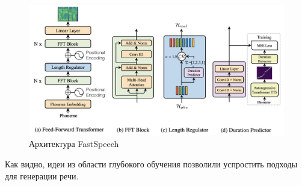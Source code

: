 \begin{figure}[!ht]
\centering
\includegraphics[width=1.0\textwidth]{images/related-work/fastspeech.png}
\caption{Архитектура FastSpeech~\cite{fastspeech}}
\label{fig:related-work:fastspeech}
\end{figure}

Как видно, идеи из области глубокого обучения позволили успростить подходы для генерации речи.